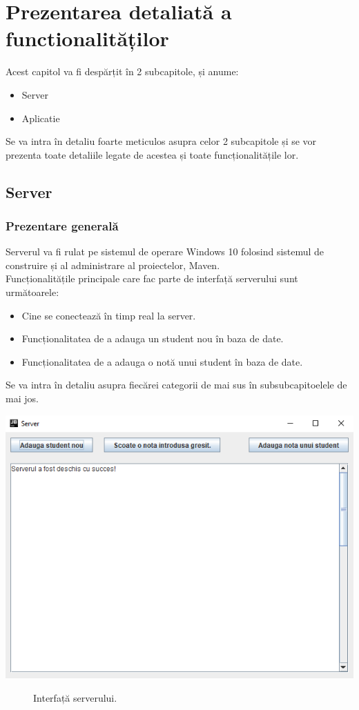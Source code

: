 \documentclass{article}
\begin{document}
	\newpage	

	\section{Prezentarea detaliată a functionalităților}
	  	Acest capitol va fi despărțit în 2 subcapitole, și anume:
		\begin {itemize}
			\item Server
			\item Aplicatie
		\end{itemize}
		Se va intra în detaliu foarte meticulos asupra celor 2 subcapitole și se vor prezenta toate detaliile legate de acestea și toate funcționalitățile lor.
		\subsection{Server}
			\subsubsection{Prezentare generală}

			Serverul va fi rulat pe sistemul de operare Windows 10 folosind sistemul de construire și al administrare al proiectelor, Maven.\\

			Funcționalitățile principale care fac parte de interfață serverului sunt următoarele:
		\begin{itemize}
			\item Cine se conectează în timp real la server.
			\item Funcționalitatea de a adauga un student nou în baza de date.
			\item Funcționalitatea de a adauga o notă unui student în baza de date.
		\end{itemize}

		Se va intra în detaliu asupra fiecărei categorii de mai sus în subsubcapitoelele de mai jos.

	\begin{center}
		\includegraphics[scale=0.7]{Source/Server}
		\begin{figure}[!h]
			{\caption*{Interfață serverului.}}
		\end{figure}
	\end{center}
\end{document}
